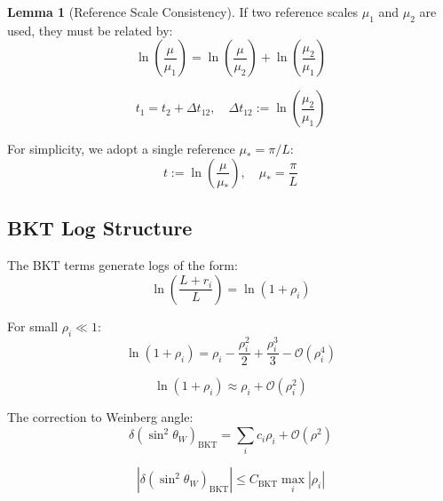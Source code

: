 \documentclass[11pt,a4paper]{article}
\theoremstyle{definition}
\newtheorem{lemma}[theorem]{Lemma}
\begin{document}
\begin{lemma}[Reference Scale Consistency]
\label{lem:ref_consistent}
If two reference scales $\mu_1$ and $\mu_2$ are used, they must be related by:
\begin{equation}
\label{eq:ref_relation}
\ln\left(\frac{\mu}{\mu_1}\right) = \ln\left(\frac{\mu}{\mu_2}\right) + \ln\left(\frac{\mu_2}{\mu_1}\right)
\end{equation}
\end{lemma}

\begin{equation}
\label{eq:ref_shift}
t_1 = t_2 + \Delta t_{12}, \quad \Delta t_{12} := \ln\left(\frac{\mu_2}{\mu_1}\right)
\end{equation}

For simplicity, we adopt a single reference $\mu_* = \pi/L$:
\begin{equation}
\label{eq:single_ref}
t := \ln\left(\frac{\mu}{\mu_*}\right), \quad \mu_* = \frac{\pi}{L}
\end{equation}

\subsection{BKT Log Structure}
\label{subsec:bkt_structure}

The BKT terms generate logs of the form:
\begin{equation}
\label{eq:bkt_log_gen}
\ln\left(\frac{L + r_i}{L}\right) = \ln(1 + \rho_i)
\end{equation}

For small $\rho_i \ll 1$:
\begin{equation}
\label{eq:bkt_expand}
\ln(1 + \rho_i) = \rho_i - \frac{\rho_i^2}{2} + \frac{\rho_i^3}{3} - \mathcal{O}(\rho_i^4)
\end{equation}

\begin{equation}
\label{eq:bkt_leading}
\ln(1 + \rho_i) \approx \rho_i + \mathcal{O}(\rho_i^2)
\end{equation}

The correction to Weinberg angle:
\begin{equation}
\label{eq:sw2_bkt_corr}
\delta(\sin^2\theta_W)_{\text{BKT}} = \sum_i c_i \rho_i + \mathcal{O}(\rho^2)
\end{equation}

\begin{equation}
\label{eq:sw2_bkt_bound}
|\delta(\sin^2\theta_W)_{\text{BKT}}| \leq C_{\text{BKT}} \max_i |\rho_i|
\end{equation}
\end{document}

